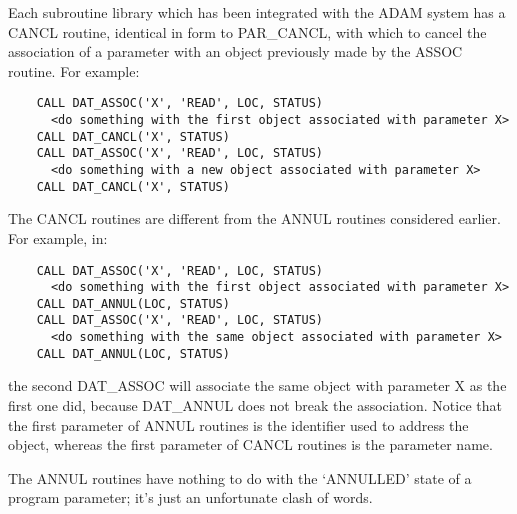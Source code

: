 Each subroutine library which has been integrated with the ADAM system has
a CANCL routine, identical in form to PAR\_CANCL, with which to cancel the
association of a parameter with an object previously made by the ASSOC routine.
For example:

\begin{small}
\begin{verbatim}
    CALL DAT_ASSOC('X', 'READ', LOC, STATUS)
      <do something with the first object associated with parameter X>
    CALL DAT_CANCL('X', STATUS)
    CALL DAT_ASSOC('X', 'READ', LOC, STATUS)
      <do something with a new object associated with parameter X>
    CALL DAT_CANCL('X', STATUS)
\end{verbatim}
\end{small}

The CANCL routines are different from the ANNUL routines considered earlier.
For example, in:

\begin{small}
\begin{verbatim}
    CALL DAT_ASSOC('X', 'READ', LOC, STATUS)
      <do something with the first object associated with parameter X>
    CALL DAT_ANNUL(LOC, STATUS)
    CALL DAT_ASSOC('X', 'READ', LOC, STATUS)
      <do something with the same object associated with parameter X>
    CALL DAT_ANNUL(LOC, STATUS)
\end{verbatim}
\end{small}

the second DAT\_ASSOC will associate the same object with parameter X as the
first one did, because DAT\_ANNUL does not break the association.
Notice that the first parameter of ANNUL routines is the identifier used to
address the object, whereas the first parameter of CANCL routines is the
parameter name.

The ANNUL routines have nothing to do with the `ANNULLED' state of a program
parameter; it's just an unfortunate clash of words.
